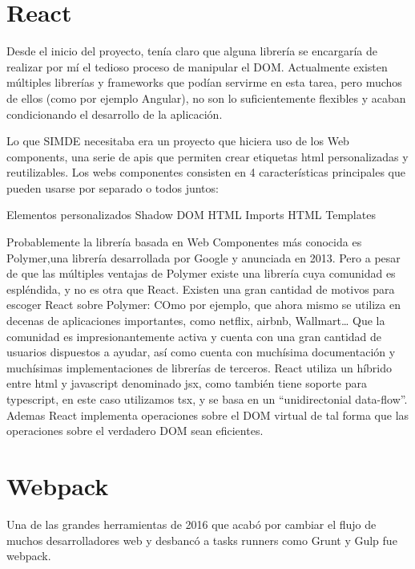 \section{React}
\label{3:sec2}

    Desde el inicio del proyecto, tenía claro que alguna librería se encargaría de realizar por mí el tedioso proceso de manipular el DOM. Actualmente existen múltiples librerías y frameworks que podían servirme en esta tarea, pero muchos de ellos (como por ejemplo Angular), no son lo suficientemente flexibles y acaban condicionando el desarrollo de la aplicación.

    Lo que SIMDE necesitaba era un proyecto que hiciera uso de los Web components, una serie de apis que permiten crear etiquetas html personalizadas y reutilizables. Los webs componentes consisten en 4 características principales que pueden usarse por separado o todos juntos:

Elementos personalizados
Shadow DOM
HTML Imports
HTML Templates

Probablemente la librería basada en Web Componentes más conocida es Polymer,una librería desarrollada por Google y anunciada en 2013. 
    Pero a pesar de que las múltiples ventajas de Polymer existe una librería cuya comunidad es espléndida, y no es otra que React.
    Existen una gran cantidad de motivos para escoger React sobre Polymer: COmo por ejemplo, que ahora mismo se utiliza en decenas de aplicaciones importantes, como netflix, airbnb, Wallmart…
    Que la comunidad es impresionantemente activa y cuenta con una gran cantidad de usuarios dispuestos a ayudar, así como cuenta con muchísima documentación y muchísimas implementaciones de librerías de terceros.
    React utiliza un híbrido entre html y javascript denominado jsx, como también tiene soporte para typescript, en este caso utilizamos tsx, y se basa en un “unidirectonial data-flow”. Ademas React implementa operaciones sobre el DOM virtual de tal forma que las operaciones sobre el verdadero DOM sean eficientes.
\section{Webpack}
\label{3:sec3}

    Una de las grandes herramientas de 2016 que acabó por cambiar el flujo de muchos desarrolladores web y desbancó a tasks runners como Grunt y Gulp fue webpack.

